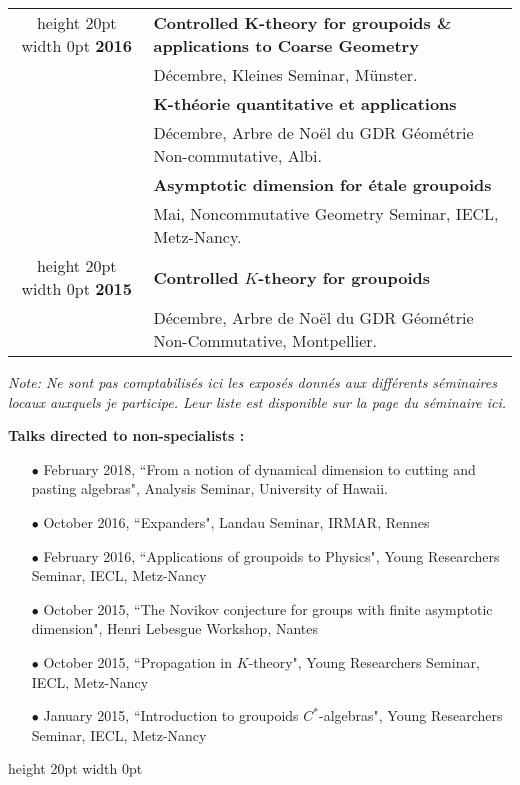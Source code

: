 \documentclass[a4paper,11pt]{article}
\newcommand\espace{\vrule height 20pt width 0pt}
\begin{document}
\begin{tabular}{cp{}}
				\espace	
\textbf{2016} & \textbf{Controlled K-theory for groupoids \& applications to Coarse Geometry}\\
				& D\'ecembre, Kleines Seminar, Münster.\\
				& \textbf{K-théorie quantitative et applications}\\
				& D\'ecembre, Arbre de Noël du GDR Géométrie Non-commutative, Albi.\\
				& \textbf{Asymptotic dimension for étale groupoids} \\
				& Mai, Noncommutative Geometry Seminar, IECL, Metz-Nancy.\\
				\espace	
\textbf{2015} & \textbf{Controlled $K$-theory for groupoids}\\
				& D\'ecembre, Arbre de Noël du GDR Géométrie Non-Commutative, Montpellier.\\
\end{tabular}

\vfill
\textit{Note: Ne sont pas comptabilis\'es ici les expos\'es donn\'es aux diff\'erents s\'eminaires locaux auxquels je participe. Leur liste est disponible sur la page du s\'eminaire ici.}
\newpage

\textbf{Talks directed to non-specialists :}\\

\begin{itemize}
\item[$\bullet$] February 2018, ``From a notion of dynamical dimension to cutting and pasting algebras", Analysis Seminar, University of Hawaii.
\item[$\bullet$] October 2016, ``Expanders", Landau Seminar, IRMAR, Rennes %
\item[$\bullet$] February 2016, ``Applications of groupoids to Physics", Young Researchers Seminar, IECL, Metz-Nancy
\item[$\bullet$] October 2015, ``The Novikov conjecture for groups with finite asymptotic dimension", Henri Lebesgue Workshop, Nantes
\item[$\bullet$] October 2015, ``Propagation in $K$-theory", Young Researchers Seminar, IECL, Metz-Nancy
\item[$\bullet$] January 2015, ``Introduction to groupoids $C^*$-algebras", Young Researchers Seminar, IECL, Metz-Nancy
\end{itemize}
\espace
\end{document}
